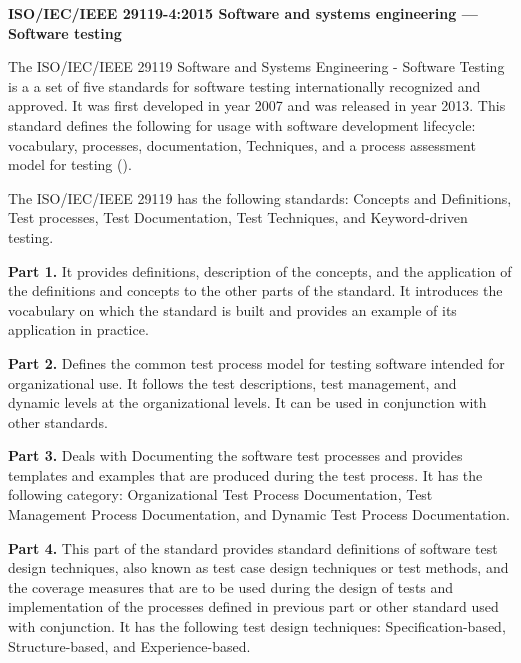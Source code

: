 \flushleft
\textbf{ISO/IEC/IEEE 29119-4:2015 Software and systems engineering — Software
testing}\\
\justifying

\parx
The ISO/IEC/IEEE 29119 Software and Systems Engineering - Software Testing is a
a set of five standards for software testing internationally recognized and
approved. It was first developed in year 2007 and was released in year 2013.
This standard defines the following for usage with software development
lifecycle: vocabulary, processes, documentation, Techniques, and a process
assessment model for testing (\cite{iso_2015}).

\parx
The ISO/IEC/IEEE 29119 has the following standards: Concepts and Definitions,
Test processes, Test Documentation, Test Techniques, and Keyword-driven testing.

\parx
\textbf{Part 1.}
\justifying
It provides definitions, description of the concepts, and the application of the
definitions and concepts to the other parts of the standard. It introduces the
vocabulary on which the standard is built and provides an example of its
application in practice.

\parx
\textbf{Part 2.}
\justifying
Defines the common test process model for testing software intended for
organizational use. It follows the test descriptions, test management, and
dynamic levels at the organizational levels. It can be used in conjunction with
other standards.

\parx
\textbf{Part 3.}
\justifying
Deals with Documenting the software test processes and provides templates and
examples that are produced during the test process. It has the following
category: Organizational Test Process Documentation, Test Management Process
Documentation, and Dynamic Test Process Documentation.

\parx
\textbf{Part 4.}
\justifying
This part of the standard provides standard definitions of software test design
techniques, also known as test case design techniques or test methods, and the
coverage measures that are to be used during the design of tests and
implementation of the processes defined in previous part or other standard used
with conjunction. It has the following test design techniques:
Specification-based, Structure-based, and Experience-based.
